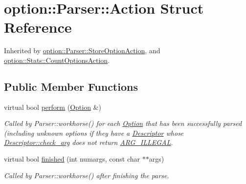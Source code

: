 \hypertarget{structoption_1_1_parser_1_1_action}{\section{option\-:\-:\-Parser\-:\-:\-Action \-Struct \-Reference}
\label{structoption_1_1_parser_1_1_action}
}


\-Inherited by \hyperlink{classoption_1_1_parser_1_1_store_option_action}{option\-::\-Parser\-::\-Store\-Option\-Action}, and \hyperlink{classoption_1_1_stats_1_1_count_options_action}{option\-::\-Stats\-::\-Count\-Options\-Action}.

\subsection*{\-Public \-Member \-Functions}
\begin{DoxyCompactItemize}
\item 
virtual bool \hyperlink{structoption_1_1_parser_1_1_action_a176b5f783bb35eb015b6d2c09422457d}{perform} (\hyperlink{classoption_1_1_option}{\-Option} \&)
\begin{DoxyCompactList}\small\item\em \-Called by \-Parser\-::workhorse() for each \hyperlink{classoption_1_1_option}{\-Option} that has been successfully parsed (including unknown options if they have a \hyperlink{structoption_1_1_descriptor}{\-Descriptor} whose \hyperlink{structoption_1_1_descriptor_aa5d675dba0214a4abd73007ff163cc67}{\-Descriptor\-::check\-\_\-arg} does not return \hyperlink{namespaceoption_aee8c76a07877335762631491e7a5a1a9a9528e32563b795bd2930b12d0a5e382d}{\-A\-R\-G\-\_\-\-I\-L\-L\-E\-G\-A\-L}. \end{DoxyCompactList}\item 
virtual bool \hyperlink{structoption_1_1_parser_1_1_action_a3ec558b51e34d33d116f14587289e032}{finished} (int numargs, const char $\ast$$\ast$args)
\begin{DoxyCompactList}\small\item\em \-Called by \-Parser\-::workhorse() after finishing the parse. \end{DoxyCompactList}\end{DoxyCompactItemize}



